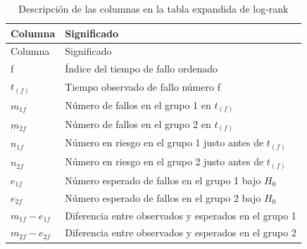 \documentclass[
]{article}
\begin{document}
\begin{tcolorbox}[enhanced jigsaw, rightrule=.15mm, toprule=.15mm, colback=white, bottomrule=.15mm, bottomtitle=1mm, left=2mm, leftrule=.75mm, arc=.35mm, breakable, title=\textcolor{quarto-callout-note-color}{\faInfo}\hspace{0.5em}{Significado de las columnas de la tabla expandida}, opacitybacktitle=0.6, colframe=quarto-callout-note-color-frame, opacityback=0, toptitle=1mm, coltitle=black, titlerule=0mm, colbacktitle=quarto-callout-note-color!10!white]

\begin{longtable}[]{@{}
  >{\raggedright\arraybackslash}p{}
  >{\raggedright\arraybackslash}p{}@{}}
\caption{Descripción de las columnas en la tabla expandida de
log-rank}\tabularnewline
\toprule\noalign{}
\begin{minipage}[b]{\linewidth}\raggedright
Columna
\end{minipage} & \begin{minipage}[b]{\linewidth}\raggedright
Significado
\end{minipage} \\
\midrule\noalign{}
\endfirsthead
\toprule\noalign{}
\begin{minipage}[b]{\linewidth}\raggedright
Columna
\end{minipage} & \begin{minipage}[b]{\linewidth}\raggedright
Significado
\end{minipage} \\
\midrule\noalign{}
\endhead
\bottomrule\noalign{}
\endlastfoot
f & Índice del tiempo de fallo ordenado \\
\(t_{(f)}\) & Tiempo observado de fallo número f \\
\(m_{1f}\) & Número de fallos en el grupo 1 en \(t_{(f)}\) \\
\(m_{2f}\) & Número de fallos en el grupo 2 en \(t_{(f)}\) \\
\(n_{1f}\) & Número en riesgo en el grupo 1 justo antes de
\(t_{(f)}\) \\
\(n_{2f}\) & Número en riesgo en el grupo 2 justo antes de
\(t_{(f)}\) \\
\(e_{1f}\) & Número esperado de fallos en el grupo 1 bajo \(H_0\) \\
\(e_{2f}\) & Número esperado de fallos en el grupo 2 bajo \(H_0\) \\
\(m_{1f} - e_{1f}\) & Diferencia entre observados y esperados en el
grupo 1 \\
\(m_{2f} - e_{2f}\) & Diferencia entre observados y esperados en el
grupo 2 \\
\end{longtable}

\end{tcolorbox}
\end{document}
